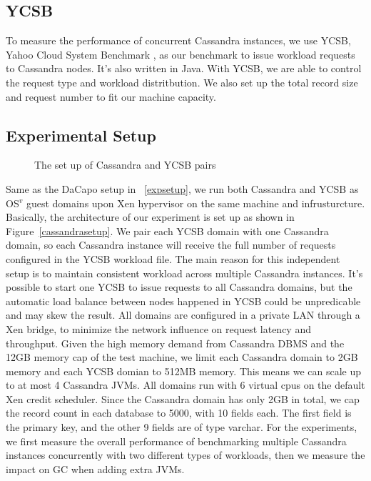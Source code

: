 \documentclass{sig-alternate}
\begin{document}
\subsection{YCSB}
To measure the performance of concurrent Cassandra instances, we use YCSB, Yahoo Cloud System Benchmark \cite{cooper2010benchmarking}, as our benchmark to issue workload requests to Cassandra nodes. It's also written in Java. With YCSB, we are able to control the request type and workload distritbution. We also set up the total record size and request number to fit our machine capacity.

\subsection{Experimental Setup}
\begin{figure}
\centering
{}
\caption{The set up of Cassandra and YCSB pairs}
\label{fig:cassandrasetup}
\end{figure}
Same as the DaCapo setup in ~\ref{expsetup}, we run both Cassandra and YCSB as OS$^{v}$ guest domains upon Xen hypervisor on the same machine and infrusturcture. Basically, the architecture of our experiment is set up as shown in Figure~\ref{cassandrasetup}. We pair each YCSB domain with one Cassandra domain, so each Cassandra instance will receive the full number of requests configured in the YCSB workload file. The main reason for this independent setup is to maintain consistent workload across multiple Cassandra instances. It's possible to start one YCSB to issue requests to all Cassandra domains, but the automatic load balance between nodes happened in YCSB could be unpredicable and may skew the result. All domains are configured in a private LAN through a Xen bridge, to minimize the network influence on request latency and throughput. Given the high memory demand from Cassandra DBMS and the 12GB memory cap of the test machine, we limit each Cassandra domain to 2GB memory and each YCSB domian to 512MB memory. This means we can scale up to at most 4 Cassandra JVMs. All domains run with 6 virtual cpus on the default Xen credit scheduler. Since the Cassandra domain has only 2GB in total, we cap the record count in each database to 5000, with 10 fields each. The first field is the primary key, and the other 9 fields are of type varchar. For the experiments, we first measure the overall performance of benchmarking multiple Cassandra instances concurrently with two different types of workloads, then we measure the impact on  GC when adding extra JVMs.
\end{document}
